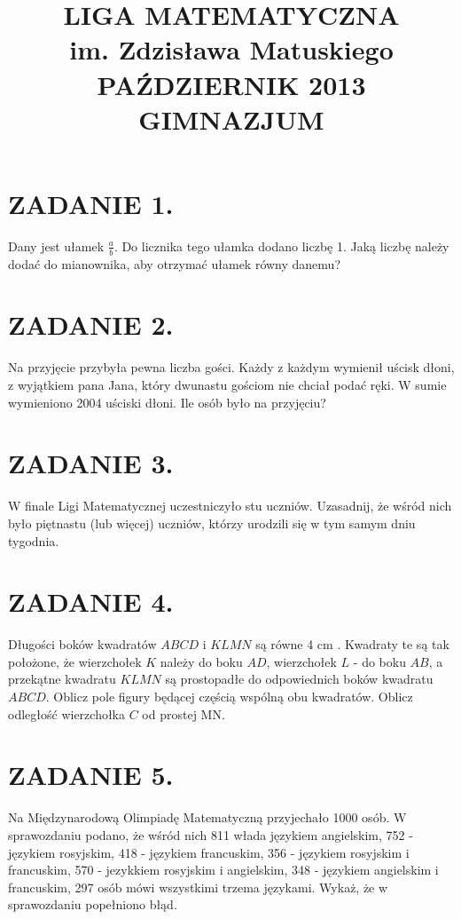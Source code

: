 \documentclass[10pt]{article}
\title{LIGA MATEMATYCZNA \\
 im. Zdzisława Matuskiego \\
 PAŹDZIERNIK 2013 \\
 GIMNAZJUM }
\author{}
\date{}
\begin{document}
\maketitle
\section*{ZADANIE 1.}
Dany jest ułamek \(\frac{a}{b}\). Do licznika tego ułamka dodano liczbę 1. Jaką liczbę należy dodać do mianownika, aby otrzymać ułamek równy danemu?

\section*{ZADANIE 2.}
Na przyjęcie przybyła pewna liczba gości. Każdy z każdym wymienił uścisk dłoni, z wyjątkiem pana Jana, który dwunastu gościom nie chciał podać ręki. W sumie wymieniono 2004 uściski dłoni. Ile osób było na przyjęciu?

\section*{ZADANIE 3.}
W finale Ligi Matematycznej uczestniczyło stu uczniów. Uzasadnij, że wśród nich było piętnastu (lub więcej) uczniów, którzy urodzili się w tym samym dniu tygodnia.

\section*{ZADANIE 4.}
Długości boków kwadratów \(A B C D\) i \(K L M N\) są równe 4 cm . Kwadraty te są tak położone, że wierzchołek \(K\) należy do boku \(A D\), wierzchołek \(L\) - do boku \(A B\), a przekątne kwadratu \(K L M N\) są prostopadłe do odpowiednich boków kwadratu \(A B C D\). Oblicz pole figury będącej częścią wspólną obu kwadratów. Oblicz odległość wierzchołka \(C\) od prostej MN.

\section*{ZADANIE 5.}
Na Międzynarodową Olimpiadę Matematyczną przyjechało 1000 osób. W sprawozdaniu podano, że wśród nich 811 włada językiem angielskim, 752 - językiem rosyjskim, 418 - językiem francuskim, 356 - językiem rosyjskim i francuskim, 570 - jezykkiem rosyjskim i angielskim, 348 - językiem angielskim i francuskim, 297 osób mówi wszystkimi trzema językami. Wykaż, że w sprawozdaniu popełniono błąd.
\end{document}
